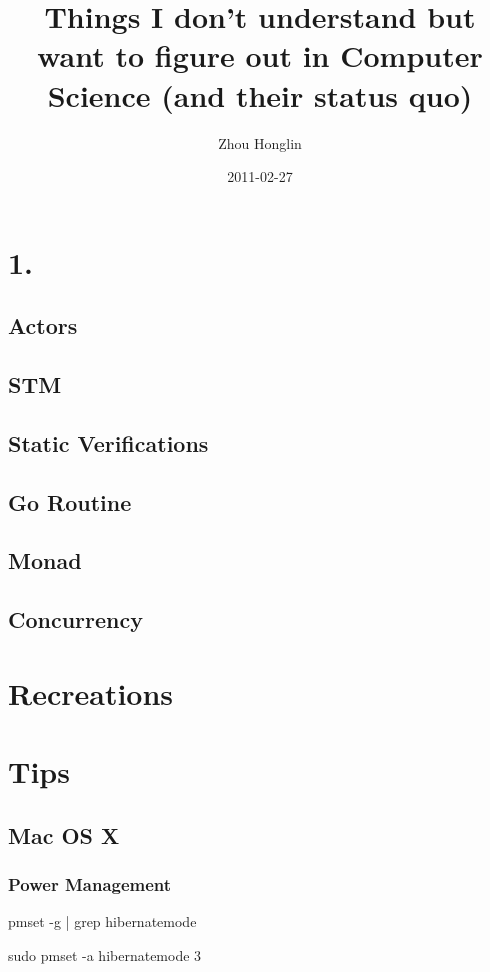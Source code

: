 \documentclass[11pt,letterpaper,twoside,openright]{book}
\title{Things I don't understand but want to figure out in Computer Science (and their status quo)}
\author{Zhou Honglin}
\date{2011-02-27}
\begin{document}
\maketitle

\chapter{1.}
\section{Actors}
\section{STM}
\section{Static Verifications}
\section{Go Routine}
\section{Monad}
\section{Concurrency}

\chapter[Or should I call it this way?]{Recreations}


\chapter[Or things iI fixed?]{Tips}
\section{Mac OS X}
\subsection{Power Management}
pmset -g | grep hibernatemode

sudo pmset -a hibernatemode 3
\end{document}

